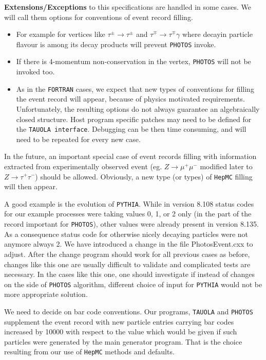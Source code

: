 \documentclass[]{Photos_interface_design}
\begin{document}
\noindent
\textbf{ Extensions/Exceptions} to this specifications  are handled in some cases. We will call them
options for conventions of event record filling.
  \begin{itemize} 
    \item  For example for vertices like $\tau^\pm \rightarrow \tau^\pm$ and $\tau^\mp \rightarrow \tau^\mp \gamma$ 
           where decayin particle flavour is among its decay products will prevent  {\tt PHOTOS} invoke.

    \item  If there is  4-momentum non-conservation in the vertex,
           {\tt PHOTOS} will not be invoked too.

    \item
           As in the {\tt FORTRAN} cases, we expect that  new  types of 
           conventions for filling the event record
           will appear, because of physics motivated requirements.
           Unfortunately, the resulting options do not always guarantee
           an algebraically closed structure.  
           Host program specific patches  may need to be defined for the 
           {\tt TAUOLA interface}. 
           Debugging can be then  time consuming, and will need to be repeated for every new
           case.
   \end{itemize}


 In the future,  an important special case of event records filling with
information extracted from experimentally observed event (eg. $Z\to \mu^+\mu^-$
 modified later to $Z\to \tau^+\tau^-$) should be allowed.
  Obviously, a new type (or types) of {\tt HepMC} filling will then appear.

A good example is the evolution of {\tt PYTHIA}. While in version 8.108 status codes for 
our example processes were  taking values 0, 1, or 2  only (in the part of the record 
important for {\tt PHOTOS}), other values were already present in
version 8.135. As a consequence status code for 
otherwise nicely decaying particles were not anymore  always 2. We have introduced 
a change  in the file PhotosEvent.cxx to adjust. After  the change
program should work for all previous cases as before, 
changes like this one are usually difficult to validate
and complicated  tests are necessary. In the cases like this one, one should  investigate 
if instead of changes on the side of  {\tt PHOTOS} algorithm, different choice of  input for {\tt PYTHIA} would not 
be more appropriate 
solution.

We need to decide on bar code conventions. Our programs, {\tt TAUOLA} and
 {\tt PHOTOS} supplement the event record with new particle entries carrying bar codes 
increased by 10000 with respect to the value which would be given if such 
particles were generated by the main generator program. 
That is the choice resulting from our use 
of {\tt HepMC} methods and defaults.  
\end{document}
